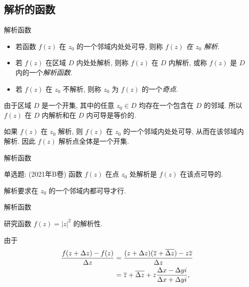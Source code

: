\subsection{解析的函数}
\begin{frame}{解析函数}
\onslide<+->
\begin{definition}
\begin{itemize}
\item 若函数 $f(z)$ 在 $z_0$ 的一个邻域内处处可导, 则称 \emph{$f(z)$ 在 $z_0$ 解析}.
\item 若 $f(z)$ 在区域 $D$ 内处处解析, 则称 $f(z)$ 在 $D$ 内解析, 或称 $f(z)$ 是 $D$ 内的一个\emph{解析函数}.
\item 若 $f(z)$ 在 $z_0$ 不解析, 则称 $z_0$ 为 $f(z)$ 的一个\emph{奇点}.
\end{itemize}
\end{definition}
\onslide<+->
由于区域 $D$ 是一个开集, 其中的任意 $z_0\in D$ 均存在一个包含在 $D$ 的邻域. 
\onslide<+->
所以 \alert{$f(z)$ 在 $D$ 内解析和在 $D$ 内可导是等价的}.

\onslide<+->
如果 $f(z)$ 在 $z_0$ 解析, 则 $f(z)$ 在 $z_0$ 的一个邻域内处处可导, 从而在该邻域内解析.
\onslide<+->
因此 \alert{$f(z)$ 解析点全体是一个开集}.
\end{frame}


\begin{frame}{解析函数}
\onslide<+->
\begin{exercise}
	单选题: (2021年B卷) 函数 $f(z)$ 在点 $z_0$ 处解析是 $f(z)$ 在该点可导的.
\end{exercise}
\onslide<+->
\begin{answer}
	解析要求在 $z_0$ 的一个邻域内都可导才行.
\end{answer}
\end{frame}

\begin{frame}{解析函数}
\onslide<+->
\begin{example}
研究函数 $f(z)=|z|^2$ 的解析性.
\end{example}
\onslide<+->
\begin{solution*}
由于
\vspace{-5pt}
\begin{align*}
\frac{f(z+\Delta z)-f(z)}{\Delta z}
&=\frac{(z+\Delta z)(\overline z+\overline{\Delta z})-z\overline z}{\Delta z}\\
&=\overline z+\overline{\Delta z}+z\frac{\Delta x-\Delta yi}{\Delta x+\Delta yi},
\end{align*}



\end{solution*}
\end{frame}

